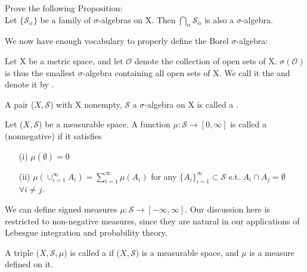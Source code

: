 \documentclass[11pt]{scrartcl}
\begin{document}
\begin{exercise} Prove the following Proposition:\\
Let $\{\mathcal{S}_\alpha\}$ be a family of $\sigma$-algebras on X. Then $\bigcap_\alpha \mathcal{S}_\alpha$ is also a $\sigma$-algebra.
\end{exercise}

We now have enough vocabulary to properly define the Borel $\sigma$-algebra:

\begin{definition}
Let X be a metric space, and let $\mathcal{O}$ denote the collection of open sets of X.  $\sigma(\mathcal{O})$ is thus the smallest $\sigma$-algebra containing all open sets of X. We call it the  and denote it by .
\end{definition}








\begin{definition}
A pair ($X,\mathcal{S}$) with X nonempty, $\mathcal{S}$ a $\sigma$-algebra on X is called a .
\end{definition}

\begin{definition}[Measure]
Let ($X,\mathcal{S}$) be a measurable space. A function $\mu : \mathcal{S} \rightarrow [0,\infty]$ is called a (nonnegative)  if it satisfies
\begin{itemize}
\item[(i)] $\mu(\emptyset) = 0$
\item[(ii)] $\mu(\cup_{i=1}^\infty A_i) = \sum_{i=1}^\infty \mu(A_i)$ for any $\{A_i\}_{i=1}^\infty \subset \mathcal{S}$ s.t. $ A_i \cap A_j = \emptyset$ $\forall i\neq j$.
\end{itemize}
\end{definition}

\begin{remark}
We can define signed measures $\mu : \mathcal{S} \rightarrow [-\infty,\infty]$. Our discussion here is restricted to non-negative measures, since they are natural in our applications of Lebesgue integration and probability theory.
\end{remark}

\begin{definition}
A triple ($X,\mathcal{S},\mu$) is called a  if ($X,\mathcal{S}$) is a measurable space, and $\mu$ is a measure defined on it.
\end{definition}
\end{document}
